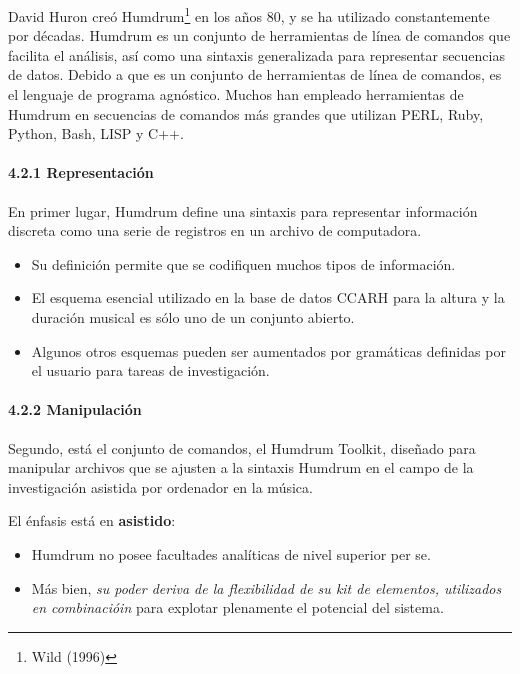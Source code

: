\documentclass[]{article}
\let\oldparagraph\paragraph
\renewcommand{\paragraph}[1]{\oldparagraph{#1}\mbox{}}
\begin{document}
David Huron creó Humdrum\footnote{Wild (1996)} en los años 80, y se ha
utilizado constantemente por décadas. Humdrum es un conjunto de
herramientas de línea de comandos que facilita el análisis, así como una
sintaxis generalizada para representar secuencias de datos. Debido a que
es un conjunto de herramientas de línea de comandos, es el lenguaje de
programa agnóstico. Muchos han empleado herramientas de Humdrum en
secuencias de comandos más grandes que utilizan PERL, Ruby, Python,
Bash, LISP y C++.

\hypertarget{representaciuxf3n}{%
\paragraph{4.2.1 Representación}\label{representaciuxf3n}}

En primer lugar, Humdrum define una sintaxis para representar
información discreta como una serie de registros en un archivo de
computadora.

\begin{itemize}
\item
  Su definición permite que se codifiquen muchos tipos de información.
\item
  El esquema esencial utilizado en la base de datos CCARH para la altura
  y la duración musical es sólo uno de un conjunto abierto.
\item
  Algunos otros esquemas pueden ser aumentados por gramáticas definidas
  por el usuario para tareas de investigación.
\end{itemize}

\hypertarget{manipulaciuxf3n}{%
\paragraph{4.2.2 Manipulación}\label{manipulaciuxf3n}}

Segundo, está el conjunto de comandos, el Humdrum Toolkit, diseñado para
manipular archivos que se ajusten a la sintaxis Humdrum en el campo de
la investigación asistida por ordenador en la música.

El énfasis está en \textbf{asistido}:

\begin{itemize}
\item
  Humdrum no posee facultades analíticas de nivel superior per se.
\item
  Más bien, \emph{su poder deriva de la flexibilidad de su kit de
  elementos, utilizados en combinacióin} para explotar plenamente el
  potencial del sistema.
\end{itemize}
\end{document}
